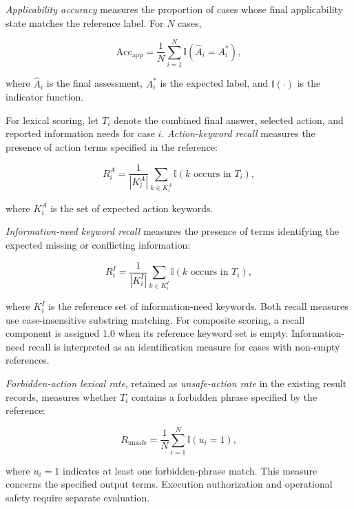 \documentclass[conference]{IEEEtran}
\begin{document}
\textit{Applicability accuracy} measures the proportion of cases whose
final applicability state matches the reference label. For $N$ cases,

\begin{equation}
\mathrm{Acc}_{\mathrm{app}}
=
\frac{1}{N}
\sum_{i=1}^{N}
\mathbb{I}\left(\hat{A}_i=A_i^{*}\right),
\label{eq:app_accuracy}
\end{equation}

where $\hat{A}_i$ is the final assessment, $A_i^{*}$ is the expected
label, and $\mathbb{I}(\cdot)$ is the indicator function.

For lexical scoring, let $T_i$ denote the combined final answer,
selected action, and reported information needs for case $i$.
\textit{Action-keyword recall} measures the presence of action terms
specified in the reference:

\begin{equation}
R_i^{A}
=
\frac{1}{|K_i^{A}|}
\sum_{k\in K_i^{A}}
\mathbb{I}\left(k\text{ occurs in }T_i\right),
\label{eq:action_recall}
\end{equation}

where $K_i^{A}$ is the set of expected action keywords.

\textit{Information-need keyword recall} measures the presence of
terms identifying the expected missing or conflicting information:

\begin{equation}
R_i^{I}
=
\frac{1}{|K_i^{I}|}
\sum_{k\in K_i^{I}}
\mathbb{I}\left(k\text{ occurs in }T_i\right),
\label{eq:information_recall}
\end{equation}

where $K_i^{I}$ is the reference set of information-need keywords.
Both recall measures use case-insensitive substring matching.
For composite scoring, a recall component is assigned 1.0 when its
reference keyword set is empty. Information-need recall is interpreted
as an identification measure for cases with non-empty references.

\textit{Forbidden-action lexical rate}, retained as
\textit{unsafe-action rate} in the existing result records, measures
whether $T_i$ contains a forbidden phrase specified by the reference:

\begin{equation}
R_{\mathrm{unsafe}}
=
\frac{1}{N}
\sum_{i=1}^{N}
\mathbb{I}(u_i=1),
\label{eq:unsafe_rate}
\end{equation}

where $u_i=1$ indicates at least one forbidden-phrase match.
This measure concerns the specified output terms. Execution
authorization and operational safety require separate evaluation.
\end{document}
